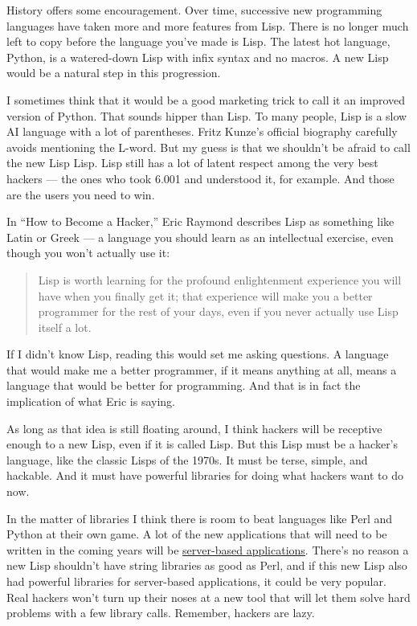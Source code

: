 History offers some encouragement. Over time, successive new programming
languages have taken more and more features from Lisp. There is no
longer much left to copy before the language you've made is Lisp. The
latest hot language, Python, is a watered-down Lisp with infix syntax
and no macros. A new Lisp would be a natural step in this progression.

I sometimes think that it would be a good marketing trick to call it an
improved version of Python. That sounds hipper than Lisp. To many
people, Lisp is a slow AI language with a lot of parentheses. Fritz
Kunze's official biography carefully avoids mentioning the L-word. But
my guess is that we shouldn't be afraid to call the new Lisp Lisp. Lisp
still has a lot of latent respect among the very best hackers --- the
ones who took 6.001 and understood it, for example. And those are the
users you need to win.

In ``How to Become a Hacker,'' Eric Raymond describes Lisp as something
like Latin or Greek --- a language you should learn as an intellectual
exercise, even though you won't actually use it:

\begin{quote}
Lisp is worth learning for the profound enlightenment experience you
will have when you finally get it; that experience will make you a
better programmer for the rest of your days, even if you never actually
use Lisp itself a lot.
\end{quote}

If I didn't know Lisp, reading this would set me asking questions. A
language that would make me a better programmer, if it means anything at
all, means a language that would be better for programming. And that is
in fact the implication of what Eric is saying.

As long as that idea is still floating around, I think hackers will be
receptive enough to a new Lisp, even if it is called Lisp. But this Lisp
must be a hacker's language, like the classic Lisps of the 1970s. It
must be terse, simple, and hackable. And it must have powerful libraries
for doing what hackers want to do now.

In the matter of libraries I think there is room to beat languages like
Perl and Python at their own game. A lot of the new applications that
will need to be written in the coming years will be
\href{road.html}{server-based applications}. There's no reason a new
Lisp shouldn't have string libraries as good as Perl, and if this new
Lisp also had powerful libraries for server-based applications, it could
be very popular. Real hackers won't turn up their noses at a new tool
that will let them solve hard problems with a few library calls.
Remember, hackers are lazy.

